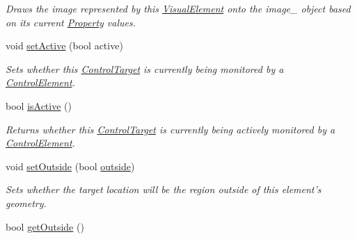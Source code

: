 \begin{DoxyCompactItemize}
\begin{DoxyCompactList}\small\item\em Draws the image represented by this \hyperlink{struct_picto_1_1_visual_element}{Visual\-Element} onto the image\-\_\- object based on its current \hyperlink{class_picto_1_1_property}{Property} values. \end{DoxyCompactList}\item 
void \hyperlink{class_picto_1_1_control_target_a36c8b737d2014a5686d8aed7ffa1429f}{set\-Active} (bool active)
\begin{DoxyCompactList}\small\item\em Sets whether this \hyperlink{class_picto_1_1_control_target}{Control\-Target} is currently being monitored by a \hyperlink{class_picto_1_1_control_element}{Control\-Element}. \end{DoxyCompactList}\item 
\hypertarget{class_picto_1_1_control_target_afb2d65410f9e72412abd7eb7840b6887}{bool \hyperlink{class_picto_1_1_control_target_afb2d65410f9e72412abd7eb7840b6887}{is\-Active} ()}\label{class_picto_1_1_control_target_afb2d65410f9e72412abd7eb7840b6887}

\begin{DoxyCompactList}\small\item\em Returns whether this \hyperlink{class_picto_1_1_control_target}{Control\-Target} is currently being actively monitored by a \hyperlink{class_picto_1_1_control_element}{Control\-Element}. \end{DoxyCompactList}\item 
\hypertarget{class_picto_1_1_control_target_aa5a30df98937efa6d2758e364dff1d85}{void \hyperlink{class_picto_1_1_control_target_aa5a30df98937efa6d2758e364dff1d85}{set\-Outside} (bool \hyperlink{class_picto_1_1_control_target_aec615efdebbbe2b0a5e4f31d5b4c44c5}{outside})}\label{class_picto_1_1_control_target_aa5a30df98937efa6d2758e364dff1d85}

\begin{DoxyCompactList}\small\item\em Sets whether the target location will be the region outside of this element's geometry. \end{DoxyCompactList}\item 
\hypertarget{class_picto_1_1_control_target_ab3f6a177d20cd4fd857a46449ad51144}{bool \hyperlink{class_picto_1_1_control_target_ab3f6a177d20cd4fd857a46449ad51144}{get\-Outside} ()}\label{class_picto_1_1_control_target_ab3f6a177d20cd4fd857a46449ad51144}


\end{DoxyCompactItemize}
